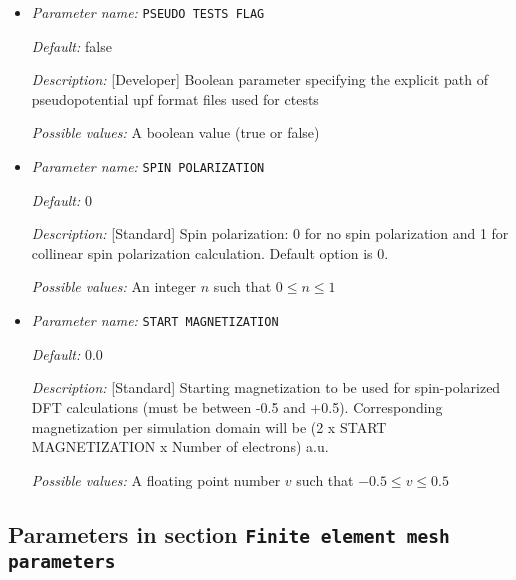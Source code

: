 \begin{itemize}
{\it Possible values:} Any string
\item {\it Parameter name:} {\tt PSEUDO TESTS FLAG}
\label{parameters:DFT functional parameters/PSEUDO TESTS FLAG}
\label{parameters:DFT_20functional_20parameters/PSEUDO_20TESTS_20FLAG}




{\it Default:} false


{\it Description:} [Developer] Boolean parameter specifying the explicit path of pseudopotential upf format files used for ctests


{\it Possible values:} A boolean value (true or false)
\item {\it Parameter name:} {\tt SPIN POLARIZATION}
\label{parameters:DFT functional parameters/SPIN POLARIZATION}
\label{parameters:DFT_20functional_20parameters/SPIN_20POLARIZATION}




{\it Default:} 0


{\it Description:} [Standard] Spin polarization: 0 for no spin polarization and 1 for collinear spin polarization calculation. Default option is 0.


{\it Possible values:} An integer $n$ such that $0\leq n \leq 1$
\item {\it Parameter name:} {\tt START MAGNETIZATION}
\label{parameters:DFT functional parameters/START MAGNETIZATION}
\label{parameters:DFT_20functional_20parameters/START_20MAGNETIZATION}




{\it Default:} 0.0


{\it Description:} [Standard] Starting magnetization to be used for spin-polarized DFT calculations (must be between -0.5 and +0.5). Corresponding magnetization per simulation domain will be (2 x START MAGNETIZATION x Number of electrons) a.u. 


{\it Possible values:} A floating point number $v$ such that $-0.5 \leq v \leq 0.5$
\end{itemize}

\subsection{Parameters in section \tt Finite element mesh parameters}
\label{parameters:Finite_20element_20mesh_20parameters}

